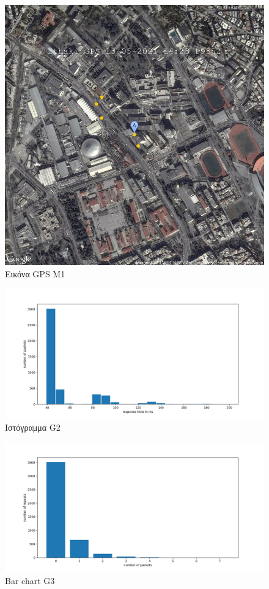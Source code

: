 \documentclass{article}
\begin{document}
\begin{figure}[H]
  \centering
  \includegraphics[width=\textwidth]{image_P9352T=225735403737T=225728403741T=225727403743T=225728403744.jpg}
  \caption{Εικόνα GPS Μ1}
  \label{fig:M1}
\end{figure}

\begin{figure}[H]
  \centering
  \includegraphics[width=\textwidth]{G2.png}
  \caption{Ιστόγραμμα G2}
  \label{fig:G2}
\end{figure}

\begin{figure}[H]
  \centering
  \includegraphics[width=\textwidth]{G3.png}
  \caption{Bar chart G3}
  \label{fig:G3}
\end{figure}
\end{document}
